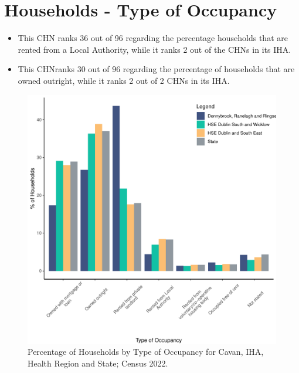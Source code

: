 \documentclass{article}
\begin{document}
\section{Households - Type of Occupancy}\label{sect:Households}
\begin{itemize}
\item This CHN ranks  36 out of 96 regarding the percentage households that are rented from a Local Authority, while it ranks  2 out of the CHNs in its IHA. 
\item This CHNranks  30 out of 96 regarding the percentage of households that are owned outright, while it ranks   2 out of 2 CHNs in its IHA.
\end{itemize}
\begin{figure}[H]
	\centering
	\includegraphics[width = 140mm]{../figures/HouseholdsED.pdf}
	\caption{Percentage of Households by Type of Occupancy for Cavan, IHA, Health Region and State; Census 2022.}
	\label{fig:vbnv}
	\end{figure}
\end{document}
